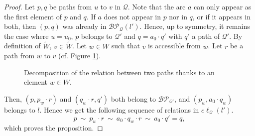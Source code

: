 \documentclass[10pt,a4paper]{article}
\renewcommand{\~}{\widetilde}
\newcommand{\Q}{\mathcal Q}
\newcommand{\BP}{\mathcal{BP}}
\newcommand{\cl}{c\ell} %
\newcommand{\concat}{\!\cdot\!} %
\newcommand{\rawvertex}[1]{\tikz{\fill[#1] (0,0) circle (2pt);}}
\begin{document}
\begin{proof}
  Let $p, q$ be paths from $u$ to $v$ in $\Q$. Note that the arc $a$ can only appear as the first element of $p$ and $q$. If $a$ does not appear in $p$ nor in $q$, or if it appears in both, then $(p,q)$ was already in $\BP_\Q(l')$. Hence, up to symmetry, it remains the case where $u=u_0$, $p$ belongs to $\Q'$ and $q=a_0 \concat q'$ with $q'$ a path of $\Q'$. By definition of $\~W$, $v \in \~W$. Let $w \in W$ such that $v$ is accessible from $w$. Let $r$ be a path from $w$ to $v$ (cf. Figure \ref{fig:two_bifurcations}).
  \begin{figure}[h]
    \begin{center}
  \end{center}
    \caption{Decomposition of the relation between two paths thanks to an element $w \in W$. \label{fig:two_bifurcations}}
  \end{figure}
  Then, $(p, p_w \concat r)$ and $(q_w \concat r, q')$ both belong to $\BP_{\Q'}$, and $(p_w, a_0 \concat q_w)$ belongs to $l$. Hence we get the following sequence of relations in $\cl_\Q(l')$.
  \[ p \ \sim \ p_w \concat r \ \sim \ a_0 \concat q_w \concat r \ \sim \ a_0 \concat q' = q, \]
  which proves the proposition.
\end{proof}
\end{document}
